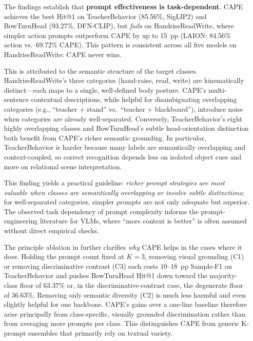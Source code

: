 \documentclass[symmetry,article,submit,pdftex,moreauthors]{Definitions/mdpi}
\begin{document}
The findings establish that \textbf{prompt effectiveness is task-dependent}.
CAPE achieves the best Hit@1 on TeacherBehavior (85.56\%, SigLIP2) and BowTurnHead (93.27\%, DFN-CLIP), but \textit{fails} on HandriseReadWrite, where simpler action prompts outperform CAPE by up to 15~pp (LAION: 84.56\% action vs.\ 69.72\% CAPE).
This pattern is consistent across all five models on HandriseReadWrite: CAPE never wins.

This is attributed to the semantic structure of the target classes.
HandriseReadWrite's three categories (hand-raise, read, write) are kinematically distinct---each maps to a single, well-defined body posture.
CAPE's multi-sentence contextual descriptions, while helpful for disambiguating overlapping categories (e.g., ``teacher + stand'' vs.\ ``teacher + blackboard''), introduce noise when categories are already well-separated.
Conversely, TeacherBehavior's eight highly overlapping classes and BowTurnHead's subtle head-orientation distinction both benefit from CAPE's richer semantic grounding.
In particular, TeacherBehavior is harder because many labels are semantically overlapping and context-coupled, so correct recognition depends less on isolated object cues and more on relational scene interpretation.

This finding yields a practical guideline: \emph{richer prompt strategies are most valuable when classes are semantically overlapping or involve subtle distinctions}; for well-separated categories, simpler prompts are not only adequate but superior.
The observed task dependency of prompt complexity informs the prompt-engineering literature for VLMs, where ``more context is better'' is often assumed without direct empirical checks.

The principle ablation in  further clarifies \emph{why} CAPE helps in the cases where it does. Holding the prompt count fixed at $K=3$, removing visual grounding (\textsc{C1}) or removing discriminative contrast (\textsc{C3}) each costs $10$--$18$~pp Sample-F1 on TeacherBehavior and pushes BowTurnHead Hit@1 down toward the majority-class floor of $63.37\%$ or, in the discriminative-contrast case, the degenerate floor of $36.63\%$. Removing only semantic diversity (\textsc{C2}) is much less harmful and even slightly helpful for one backbone. CAPE's gains over a one-line baseline therefore arise principally from class-specific, visually grounded discrimination rather than from averaging more prompts per class. This distinguishes CAPE from generic K-prompt ensembles that primarily rely on textual variety.
\end{document}
